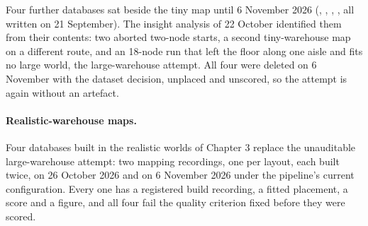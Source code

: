 \documentclass[11pt,a4paper,notitlepage]{report}
\begin{document}
\begin{queried}
Four further databases sat beside the tiny map until 6 November 2026
(, , ,
, all written on 21 September). The insight analysis of
22 October identified them from their contents: two aborted two-node starts,
a second tiny-warehouse map on a different route, and an 18-node run that
left the floor along one aisle and fits no large world, the large-warehouse
attempt. All four were deleted on 6 November with the dataset decision,
unplaced and unscored, so the attempt is again without an artefact.
\end{queried}

\paragraph{Realistic-warehouse maps.} Four databases built in the realistic
worlds of Chapter 3 replace the unauditable large-warehouse attempt: two
mapping recordings, one per layout, each built twice, on 26 October 2026 and on
6 November 2026 under the pipeline's current configuration. Every one has a
registered build recording, a fitted placement, a score and a figure, and all
four fail the quality criterion fixed before they were scored.
\end{document}
